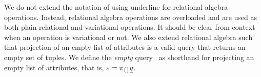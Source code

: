 We do not extend the notation of using underline for relational algebra
operations. Instead, relational algebra operations are overloaded and are used
as both plain relational and variational operations. It should be clear from
context when an operation is variational or not. 
%
We also extend relational algebra such that projection of an empty list of
attributes is a valid query that returns an empty set of tuples. We define the
\emph{empty} query \empPRel\ as shorthand for projecting an empty list of
attributes, that is, $\empPRel = \pi_{\{\}} \pQ$.
